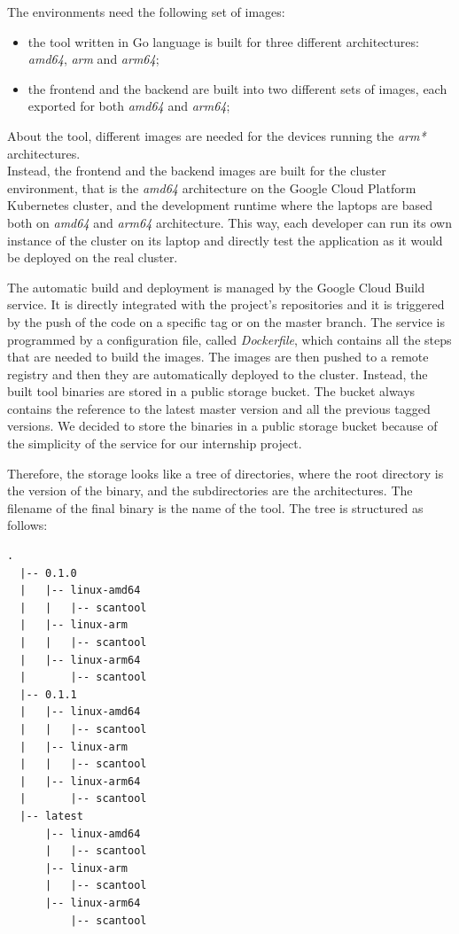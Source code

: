 The environments need the following set of images:
\begin{itemize}
  \item the tool written in Go language is built for three different architectures: \textit{amd64}, \textit{arm} and \textit{arm64};
  \item the frontend and the backend are built into two different sets of images, each exported for both \textit{amd64} and \textit{arm64};
\end{itemize}

About the tool, different images are needed for the devices running the \textit{arm*} architectures. \\
Instead, the frontend and the backend images are built for the cluster environment, that is the \textit{amd64} architecture on the Google Cloud Platform Kubernetes cluster, and the development runtime where the laptops are based both on \textit{amd64} and \textit{arm64} architecture. This way, each developer can run its own instance of the cluster on its laptop and directly test the application as it would be deployed on the real cluster.

The automatic build and deployment is managed by the Google Cloud Build service. It is directly integrated with the project's repositories and it is triggered by the push of the code on a specific tag or on the master branch. The service is programmed by a configuration file, called \textit{Dockerfile}, which contains all the steps that are needed to build the images. The images are then pushed to a remote registry and then they are automatically deployed to the cluster. Instead, the built tool binaries are stored in a public storage bucket. The bucket always contains the reference to the latest master version and all the previous tagged versions. We decided to store the binaries in a public storage bucket because of the simplicity of the service for our internship project.

Therefore, the storage looks like a tree of directories, where the root directory is the version of the binary, and the subdirectories are the architectures. The filename of the final binary is the name of the tool. The tree is structured as follows:

\begin{lstlisting}[caption={Storage bucket tree of directories}]
  .
  |-- 0.1.0
  |   |-- linux-amd64
  |   |   |-- scantool
  |   |-- linux-arm
  |   |   |-- scantool
  |   |-- linux-arm64
  |       |-- scantool
  |-- 0.1.1
  |   |-- linux-amd64
  |   |   |-- scantool
  |   |-- linux-arm
  |   |   |-- scantool
  |   |-- linux-arm64
  |       |-- scantool
  |-- latest
      |-- linux-amd64
      |   |-- scantool
      |-- linux-arm
      |   |-- scantool
      |-- linux-arm64
          |-- scantool
\end{lstlisting}

